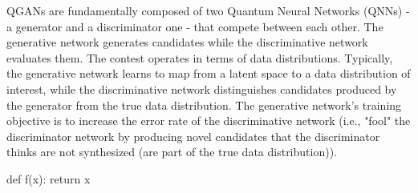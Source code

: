 QGANs are fundamentally composed of two Quantum Neural Networks (QNNs) - a generator and a discriminator one - that compete between each other. The generative network generates candidates while the discriminative network evaluates them. The contest operates in terms of data distributions. Typically, the generative network learns to map from a latent space to a data distribution of interest, while the discriminative network distinguishes candidates produced by the generator from the true data distribution. The generative network's training objective is to increase the error rate of the discriminative network (i.e., "fool" the discriminator network by producing novel candidates that the discriminator thinks are not synthesized (are part of the true data distribution)).

\begin{python}
def f(x):
    return x
\end{python}